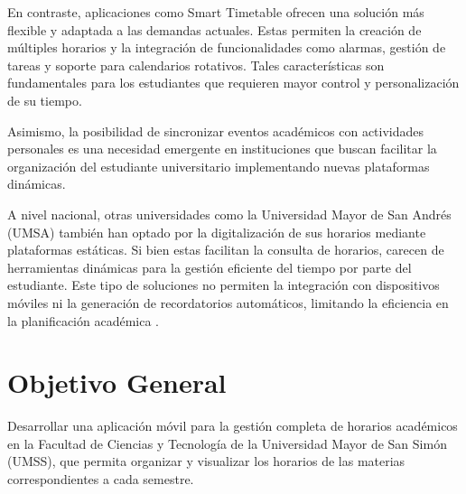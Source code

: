 En contraste, aplicaciones como Smart Timetable \cite{smart_timetable} ofrecen una solución más flexible y adaptada a las demandas actuales. Estas permiten la creación de múltiples horarios y la integración de funcionalidades como alarmas, gestión de tareas y soporte para calendarios rotativos. Tales características son fundamentales para los estudiantes que requieren mayor control y personalización de su tiempo.

Asimismo, la posibilidad de sincronizar eventos académicos con actividades personales es una necesidad emergente en instituciones que buscan facilitar la organización del estudiante universitario implementando nuevas plataformas dinámicas.

A nivel nacional, otras universidades como la Universidad Mayor de San Andrés (UMSA) también han optado por la digitalización de sus horarios mediante plataformas estáticas. Si bien estas facilitan la consulta de horarios, carecen de herramientas dinámicas para la gestión eficiente del tiempo por parte del estudiante. Este tipo de soluciones no permiten la integración con dispositivos móviles ni la generación de recordatorios automáticos, limitando la eficiencia en la planificación académica \cite{campushome_apps}.

\section{Objetivo General}
Desarrollar una aplicación móvil para la gestión completa de horarios académicos en la Facultad de Ciencias y Tecnología de la Universidad Mayor de San Simón (UMSS), que permita organizar y visualizar los horarios de las materias correspondientes a cada semestre.


